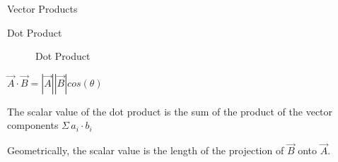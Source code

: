 \begin{section}{Vector Products}
  \begin{subsection}{Dot Product}
    \begin{figure}[H]
      \begin{center}
        \caption{Dot Product}
      \end{center}
    \end{figure}
    $\vec{A}\cdot\vec{B} =
    \left|\vec{A}\right|\left|\vec{B}\right|cos(\theta)$

    The scalar value of the dot product is the sum of the product of
    the vector components $\Sigma\, a_i \cdot b_i$

    Geometrically, the scalar value is the length of the projection of
    $\vec{B}$ onto $\vec{A}$.

  \end{subsection}


\end{section}
